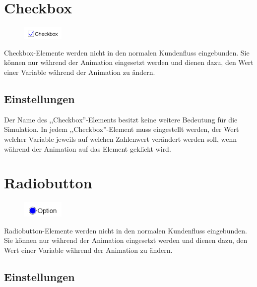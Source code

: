 \section{Checkbox}
\label{ref:ModelElementInteractiveCheckbox}

\begin{figure}
\vspace{-22pt}
\includegraphics[width=2cm]{imageModelElementInteractiveCheckbox.png}
\vspace{-22pt}
\end{figure}

Checkbox-Elemente werden nicht in den normalen Kundenfluss eingebunden.
Sie können nur während der Animation eingesetzt werden und dienen dazu,
den Wert einer Variable während der Animation zu ändern.

\subsection*{Einstellungen}

Der Name des ,,Checkbox''-Elements besitzt keine weitere Bedeutung für die Simulation.
In jedem ,,Checkbox''-Element muss eingestellt werden, der Wert welcher Variable
jeweils auf welchen Zahlenwert verändert werden soll, wenn während der Animation
auf das Element geklickt wird.


\section{Radiobutton}
\label{ref:ModelElementInteractiveRadiobutton}

\begin{figure}
\vspace{-22pt}
\includegraphics[width=2cm]{imageModelElementInteractiveRadiobutton.png}
\vspace{-22pt}
\end{figure}

Radiobutton-Elemente werden nicht in den normalen Kundenfluss eingebunden.
Sie können nur während der Animation eingesetzt werden und dienen dazu,
den Wert einer Variable während der Animation zu ändern.

\subsection*{Einstellungen}

